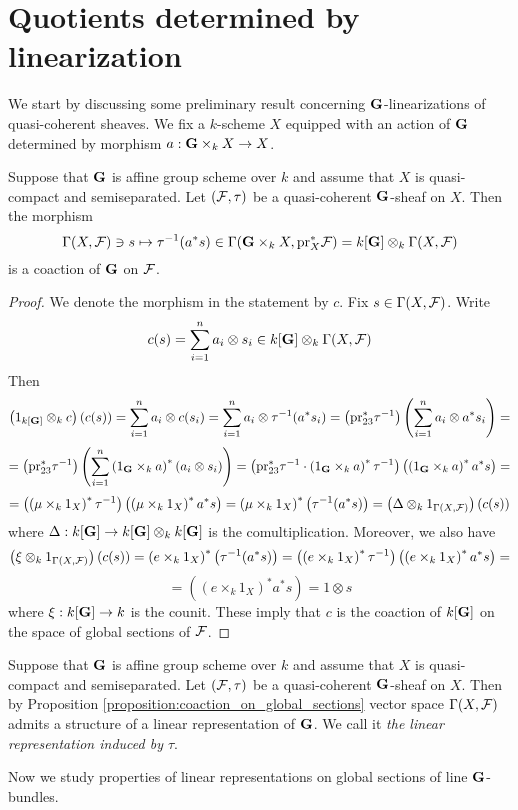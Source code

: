 \section{Quotients determined by linearization}
\noindent
We start by discussing some preliminary result concerning $\mathbf{G}$-linearizations of quasi-coherent sheaves. We fix a $k$-scheme $X$ equipped with an action of $\mathbf{G}$ determined by morphism $a:\mathbf{G}\times_kX\rightarrow X$.

\begin{proposition}\label{proposition:coaction_on_global_sections}
Suppose that $\mathbf{G}$ is affine group scheme over $k$ and assume that $X$ is quasi-compact and semiseparated. Let $({\mathcal F},\tau)$ be a quasi-coherent $\mathbf{G}$-sheaf on $X$. Then the morphism
$$\Gamma(X,{\mathcal F})\ni s \mapsto \tau^{-1}(a^*s) \in \Gamma(\mathbf{G}\times_kX,\mathrm{pr}^*_X{\mathcal F}) = k[\mathbf{G}]\otimes_k\Gamma(X,{\mathcal F})$$
is a coaction of $\mathbf{G}$ on ${\mathcal F}$.
\end{proposition}
\begin{proof}
We denote the morphism in the statement by $c$. Fix $s\in \Gamma(X,{\mathcal F})$. Write
$$c(s) = \sum_{i=1}^na_i\otimes s_i\in k[\mathbf{G}]\otimes_k\Gamma(X,{\mathcal F})$$
Then
$$\left(1_{k[\mathbf{G}]}\otimes_kc\right)\left(c(s)\right) = \sum_{i=1}^na_i\otimes c(s_i) = \sum_{i=1}^na_i\otimes \tau^{-1}(a^*s_i) = \left(\mathrm{pr}_{23}^*\tau^{-1}\right)\left(\sum_{i=1}^na_i \otimes a^*s_i\right) = $$
$$=\left(\mathrm{pr}_{23}^*\tau^{-1}\right)\left(\sum_{i=1}^n\left(1_{\mathbf{G}}\times_ka\right)^*\left(a_i \otimes s_i\right)\right)=\left(\mathrm{pr}_{23}^*\tau^{-1} \cdot \left(1_{\mathbf{G}}\times_ka\right)^*\tau^{-1}\right)\left(\left(1_{\mathbf{G}}\times_ka\right)^*a^*s\right) =$$
$$= \left(\left(\mu\times_k1_X\right)^*\tau^{-1}\right)\left(\left(\mu\times_k1_X\right)^*a^*s\right) =\left(\mu\times_k1_X\right)^*\left(\tau^{-1}(a^*s)\right) = \left(\Delta \otimes_k 1_{\Gamma(X,{\mathcal F})}\right)\left(c(s)\right)$$
where $\Delta:k[\mathbf{G}]\rightarrow k[\mathbf{G}]\otimes_kk[\mathbf{G}]$ is the comultiplication. Moreover, we also have
$$\left(\xi\otimes_k1_{\Gamma(X,{\mathcal F})}\right)\left(c(s)\right) = \left(e\times_k1_{X}\right)^*\left(\tau^{-1}(a^*s)\right) = \left(\left(e\times_k1_{X}\right)^*\tau^{-1}\right)\left(\left(e\times_k1_{X}\right)^*a^*s\right) =$$
$$= \left(\left(e\times_k1_{X}\right)^*a^*s\right) = 1\otimes s$$
where $\xi:k[\mathbf{G}]\rightarrow k$ is the counit. These imply that $c$ is the coaction of $k[\mathbf{G}]$ on the space of global sections of ${\mathcal F}$.
\end{proof}

\begin{definition}
Suppose that $\mathbf{G}$ is affine group scheme over $k$ and assume that $X$ is quasi-compact and semiseparated. Let $({\mathcal F},\tau)$ be a quasi-coherent $\mathbf{G}$-sheaf on $X$. Then by Proposition \ref{proposition:coaction_on_global_sections} vector space $\Gamma(X,{\mathcal F})$ admits a structure of a linear representation of $\mathbf{G}$. We call it \textit{the linear representation induced by $\tau$}.
\end{definition}
\noindent
Now we study properties of linear representations on global sections of line $\mathbf{G}$-bundles.

